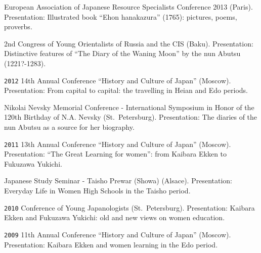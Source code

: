 \documentclass[]{article}
\begin{document}
European Association of Japanese Resource Specialists Conference 2013
(Paris). Presentation: Illustrated book ``Ehon hanakazura'' (1765):
pictures, poems, proverbs.

2nd Congress of Young Orientalists of Russia and the CIS (Baku).
Presentation: Distinctive features of ``The Diary of the Waning Moon''
by the nun Abutsu (1221?-1283).

\texttt{2012} 14th Annual Conference ``History and Culture of Japan''
(Moscow). Presentation: From capital to capital: the travelling in Heian
and Edo periods.

Nikolai Nevsky Memorial Conference - International Symposium in Honor of
the 120th Birthday of N.A. Nevsky (St.~Petersburg). Presentation: The
diaries of the nun Abutsu as a source for her biography.

\texttt{2011} 13th Annual Conference ``History and Culture of Japan''
(Moscow). Presentation: ``The Great Learning for women'': from Kaibara
Ekken to Fukuzawa Yukichi.

Japanese Study Seminar - Taisho Prewar (Showa) (Alsace). Presentation:
Everyday Life in Women High Schools in the Taisho period.

\texttt{2010} Conference of Young Japanologists (St.~Petersburg).
Presentation: Kaibara Ekken and Fukuzawa Yukichi: old and new views on
women education.

\texttt{2009} 11th Annual Conference ``History and Culture of Japan''
(Moscow). Presentation: Kaibara Ekken and women learning in the Edo
period.
\end{document}
